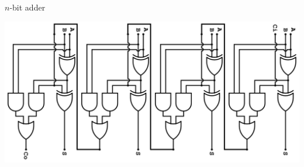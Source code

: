 \begin{frame}{$n$-bit adder}
	\begin{center}
		\includegraphics[width=\textwidth]{nbit_adder}
	\end{center}
\end{frame}

